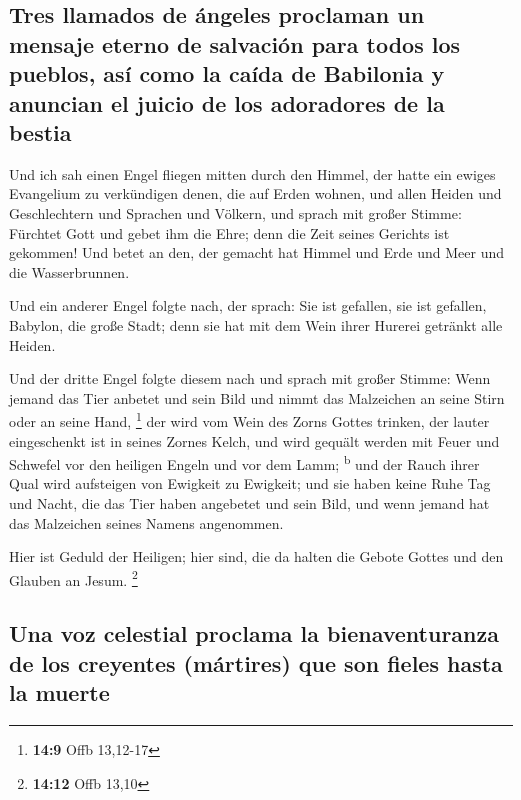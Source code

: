 \hypertarget{tres-llamados-de-uxe1ngeles-proclaman-un-mensaje-eterno-de-salvaciuxf3n-para-todos-los-pueblos-asuxed-como-la-cauxedda-de-babilonia-y-anuncian-el-juicio-de-los-adoradores-de-la-bestia}{%
\subsection{Tres llamados de ángeles proclaman un mensaje eterno de
salvación para todos los pueblos, así como la caída de Babilonia y
anuncian el juicio de los adoradores de la
bestia}\label{tres-llamados-de-uxe1ngeles-proclaman-un-mensaje-eterno-de-salvaciuxf3n-para-todos-los-pueblos-asuxed-como-la-cauxedda-de-babilonia-y-anuncian-el-juicio-de-los-adoradores-de-la-bestia}}

 Und ich sah einen Engel fliegen mitten durch den Himmel,
der hatte ein ewiges Evangelium zu verkündigen denen, die auf Erden
wohnen, und allen Heiden und Geschlechtern und Sprachen und Völkern,
 und sprach mit großer Stimme: Fürchtet Gott und gebet ihm
die Ehre; denn die Zeit seines Gerichts ist gekommen! Und betet an den,
der gemacht hat Himmel und Erde und Meer und die Wasserbrunnen.

 Und ein anderer Engel folgte nach, der sprach: Sie ist
gefallen, sie ist gefallen, Babylon, die große Stadt; denn sie hat mit
dem Wein ihrer Hurerei getränkt alle Heiden.

 Und der dritte Engel folgte diesem nach und sprach mit
großer Stimme: Wenn jemand das Tier anbetet und sein Bild und nimmt das
Malzeichen an seine Stirn oder an seine Hand, \footnote{\textbf{14:9}
  Offb 13,12-17}  der wird vom Wein des Zorns Gottes
trinken, der lauter eingeschenkt ist in seines Zornes Kelch, und wird
gequält werden mit Feuer und Schwefel vor den heiligen Engeln und vor
dem Lamm; \textsuperscript{b}  und der Rauch ihrer Qual
wird aufsteigen von Ewigkeit zu Ewigkeit; und sie haben keine Ruhe Tag
und Nacht, die das Tier haben angebetet und sein Bild, und wenn jemand
hat das Malzeichen seines Namens angenommen.

 Hier ist Geduld der Heiligen; hier sind, die da halten
die Gebote Gottes und den Glauben an Jesum. \footnote{\textbf{14:12}
  Offb 13,10}

\hypertarget{una-voz-celestial-proclama-la-bienaventuranza-de-los-creyentes-muxe1rtires-que-son-fieles-hasta-la-muerte}{%
\subsection{Una voz celestial proclama la bienaventuranza de los
creyentes (mártires) que son fieles hasta la
muerte}\label{una-voz-celestial-proclama-la-bienaventuranza-de-los-creyentes-muxe1rtires-que-son-fieles-hasta-la-muerte}}

